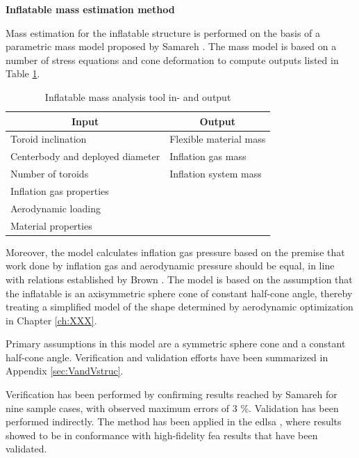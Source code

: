 \textbf{Inflatable mass estimation method}

Mass estimation for the inflatable structure is performed on the basis of a parametric mass model proposed by Samareh \cite{Samareh2011}. The mass model is based on a number of stress equations and cone deformation to compute outputs listed in Table \ref{tab:inflmass}.
\begin{table}[h]
\caption{Inflatable mass analysis tool in- and output}
\centering
\begin{tabular}{|l||l|}
\hline
\multicolumn{1}{|c||}{{\bf Input}} & \multicolumn{1}{c|}{{\bf Output}} \\ \hline \hline
Toroid inclination         & Flexible material mass            \\ \hline
Centerbody and deployed diameter        & Inflation gas mass                 \\ \hline
Number of toroids                 & Inflation system mass                \\ \hline
Inflation gas properties              &              \\ \hline
Aerodynamic loading               &                                   \\ \hline
Material properties  &                                   \\ \hline
\end{tabular}
\label{tab:inflmass}
\end{table}
Moreover, the model calculates inflation gas pressure based on the premise that work done by inflation gas and aerodynamic pressure should be equal, in line with relations established by Brown \cite{Brown2009}. The model is based on the assumption that the inflatable is an axisymmetric sphere cone of constant half-cone angle, thereby treating a simplified model of the shape determined by aerodynamic optimization in Chapter \ref{ch:XXX}. 

Primary assumptions in this model are a symmetric sphere cone and a constant half-cone angle. Verification and validation efforts have been summarized in Appendix \ref{sec:VandVstruc}.

Verification has been performed by confirming results reached by Samareh \cite[p.16]{Samareh2011} for nine sample cases, with observed maximum errors of 3 $\%$. Validation has been performed indirectly. The method has been applied in the \gls{edlsa} \cite{Cianciolo2010}, where results showed to be in conformance with high-fidelity \gls{fea} results that have been validated.









